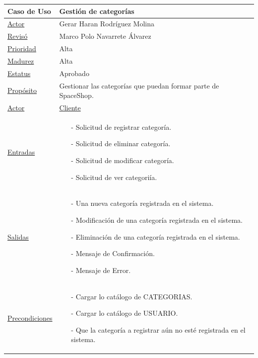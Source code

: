 				\begin{longtable}{p{4cm}|p{11cm}}
				\hline
					{Caso de Uso}&{Gesti\'on de categor\'ias}\\
				\hline
					{\hyperlink {Autor}{Actor}}&{Gerar Haran Rodr\'iguez Molina}\\
				\hline
					{\hyperlink {Reviso}{Revis\'o}}&{Marco Polo Navarrete \'Alvarez}\\
				\hline
					{\hyperlink {Prioridad}{Prioridad}}&{Alta}\\
				\hline
					{\hyperlink {Madurez}{Madurez}}&{Alta}\\
				\hline
					{\hyperlink {Estatus}{Estatus}}&{Aprobado}\\
				\hline
					{\hyperlink {Proposito}{Prop\'osito}}&{Gestionar las categor\'ias que puedan formar parte de SpaceShop.}\\
				\hline
					{\hyperlink {Actor}{Actor}}&{\hyperlink{Cliente}{Cliente} }\\
				\hline
					{\hyperlink {Entradas}{Entradas}}&{ 
					\begin{itemize}
						\item[-] Solicitud de registrar categor\'ia.
						\item[-] Solicitud de eliminar categor\'ia.
						\item[-] Solicitud de modificar categor\'ia.
						\item[-] Solicitud de ver categori\'ia.
					\end{itemize}	 
					}\\
				\hline
					{\hyperlink {Salidas}{Salidas}}&{
					\begin{itemize}
						\item[-] Una nueva categor\'ia registrada en el sistema.
						\item[-] Modificaci\'on de una categor\'ia registrada en el sistema.
						\item[-] Eliminaci\'on de una categor\'ia registrada en el sistema.
						\item[-] Mensaje de Confirmaci\'on.
						\item[-] Mensaje de Error.
					\end{itemize}		
					}\\

				\hline
					{\hyperlink {Precondiciones}{Precondiciones}}&{
					\begin{itemize}
						\item[-] Cargar lo cat\'alogo de CATEGORIAS.
						\item[-] Cargar lo cat\'alogo de USUARIO.
						\item[-] Que la categor\'ia a registrar a\'un no est\'e registrada en el sistema.
						\end{itemize}	
					}\\


\end{longtable}
